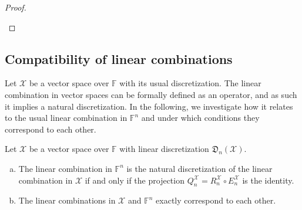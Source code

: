 \documentclass[a4paper]{paper}
\newcommand{\Discr}{\mathfrak{D}}
\newcommand{\Spc}[1]{\mathscr{#1}}
\newcommand{\Field}{\mathbb{F}}
\newcommand*{\EXT}[2]{\ensuremath{E_{#1}^{#2}}}
\newcommand*{\REST}[2]{\ensuremath{R_{#1}^{#2}}}
\newcommand*{\COPROJ}[2]{\ensuremath{Q_{#1}^{#2}}}
\newcommand*{\RnX}{\ensuremath{\REST{n}{\Spc{X}}}}
\newcommand*{\EnX}{\ensuremath{\EXT{n}{\Spc{X}}}}
\newcommand*{\QnX}{\ensuremath{\COPROJ{n}{\Spc{X}}}}
\begin{document}
\begin{proof}
\begin{enumerate}[(a)]
 \end{enumerate}
\end{proof}



\subsection{Compatibility of linear combinations}
\label{subsec:prop:lincomb}

Let $\Spc{X}$ be a vector space over $\Field$ with its usual discretization. The linear combination in vector spaces 
can be formally defined as an operator, and as such it implies a natural discretization. In the following, we 
investigate how it relates to the usual linear combination in $\Field^n$ and under which conditions they correspond to 
each other.

\begin{lemma}
 \label{lemma:prop:lincomb:natural_corresp}
 Let $\Spc{X}$ be a vector space over $\Field$ with linear discretization $\Discr_{n}(\Spc{X})$.
 \begin{enumerate}[(a)]
  \item The linear combination in $\Field^n$ is the natural discretization of the linear combination in $\Spc{X}$ if 
  and only if the projection $\QnX = \RnX \circ \EnX$ is the identity.
  
  \item The linear combinations in $\Spc{X}$ and $\Field^n$ exactly correspond to each other.
 \end{enumerate}
\end{lemma}
\end{document}
